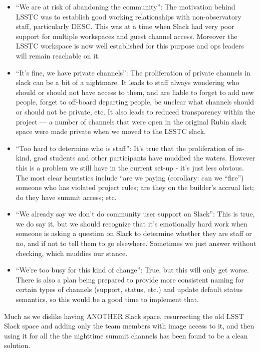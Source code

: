 \begin{itemize}
\item ``We are at risk of abandoning the community'': The motivation behind LSSTC was to establish good working relationships with non-observatory staff, particularly DESC. This was at a time when Slack had very poor support for multiple workspaces and guest channel access. Moreover the LSSTC workspace is now well established for this purpose and ops leaders will remain reachable on it.
\item  ``It's fine, we have private channels'': The proliferation of private channels in slack can be a bit of a nightmare. It leads to staff always wondering who should or should not have access to them, and are liable to forget to add new people, forget to off-board departing people, be unclear what channels  should or should not be private, etc. It also leads to reduced transparency within the project --- a number of channels that were open in the original Rubin slack space were made private when we moved to the LSSTC slack.
\item  ``Too hard to determine who is staff'': It's true that the proliferation of in-kind, grad students and other participants have muddied the waters. However this is a problem we still have in the current set-up -  it's just less obvious. The most clear heuristics include “are we paying (corollary: can we “fire”) someone who has violated project rules; are they on the builder's accrual list; do they have summit access; etc.
\item  ``We already say we don't do community user support on Slack'': This is true, we do say it, but we should recognize that it's emotionally hard work when someone is asking a question on Slack to determine whether they are staff or no, and if not to tell them to go elsewhere. Sometimes we just answer without checking, which muddies our stance.
\item  ``We're too busy for this kind of change'': True, but this will only get worse. There is also a plan being prepared to provide more consistent naming for certain types of channels (support, status, etc.) and update default status semantics,  so this would be a good time to implement that.
\end{itemize}


Much as we dislike having ANOTHER Slack space, resurrecting the old LSST Slack space and adding only the team members with image access to it, and then using it for all the the nighttime summit channels has been found to be a clean solution.

